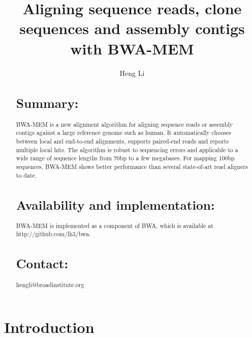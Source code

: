 \documentclass{bioinfo}
\begin{document}

\title{Aligning sequence reads, clone sequences and assembly contigs with BWA-MEM}

\author[Li]{Heng Li}

\address{Broad Institute of Harvard and MIT, 7 Cambridge Center, Cambridge, MA 02142, USA}

\maketitle

\begin{abstract}
\section{Summary:} BWA-MEM is a new alignment algorithm for aligning sequence
reads or assembly contigs against a large reference genome such as human.
It automatically chooses between local and end-to-end alignments, supports
paired-end reads and reports multiple local hits. The algorithm is robust to
sequencing errors and applicable to a wide range of sequence lengths from 70bp
to a few megabases. For mapping 100bp sequences, BWA-MEM shows better
performance than several state-of-art read aligners to date.

\section{Availability and implementation:} BWA-MEM is implemented as a
component of BWA, which is available at http://github.com/lh3/bwa.

\section{Contact:} hengli@broadinstitute.org
\end{abstract}

\section{Introduction}
\end{document}
